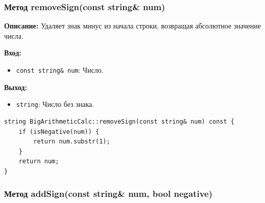 




\subsubsection{Метод removeSign(const string\& num)}

\textbf{Описание:} Удаляет знак минус из начала строки, возвращая абсолютное значение числа.

\textbf{Вход:}
\begin{itemize}
    \item \texttt{const string\& num}: Число.
\end{itemize}

\textbf{Выход:}
\begin{itemize}
    \item \texttt{string}:  Число без знака.
\end{itemize}

\begin{lstlisting}[style=cstyle, caption={Реализация removeSign()}]
string BigArithmeticCalc::removeSign(const string& num) const {
    if (isNegative(num)) {
        return num.substr(1);
    }
    return num;
}
\end{lstlisting}

\newpage

\subsubsection{Метод addSign(const string\& num, bool negative)}

